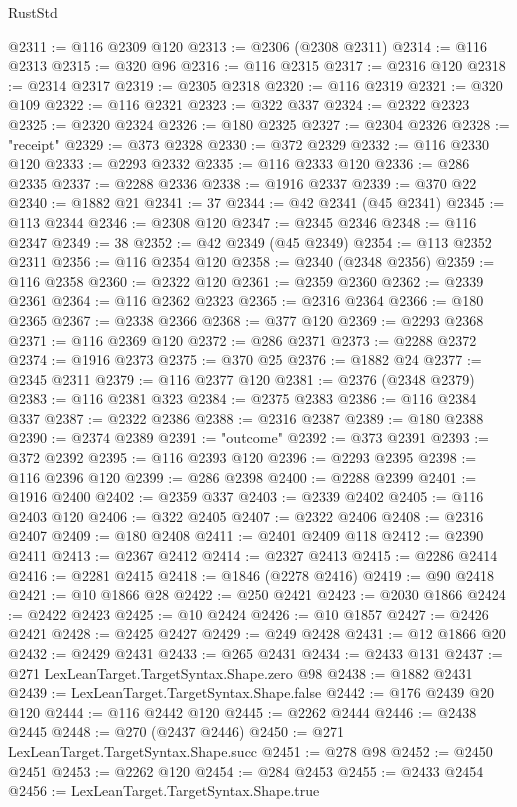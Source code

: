 \begin{lexlean}{RustStd}
\begin{coremodule}
@2311 := @116 @2309 @120
@2313 := @2306 (@2308 @2311)
@2314 := @116 @2313
@2315 := @320 @96
@2316 := @116 @2315
@2317 := @2316 @120
@2318 := @2314 @2317
@2319 := @2305 @2318
@2320 := @116 @2319
@2321 := @320 @109
@2322 := @116 @2321
@2323 := @322 @337
@2324 := @2322 @2323
@2325 := @2320 @2324
@2326 := @180 @2325
@2327 := @2304 @2326
@2328 := "receipt"
@2329 := @373 @2328
@2330 := @372 @2329
@2332 := @116 @2330 @120
@2333 := @2293 @2332
@2335 := @116 @2333 @120
@2336 := @286 @2335
@2337 := @2288 @2336
@2338 := @1916 @2337
@2339 := @370 @22
@2340 := @1882 @21
@2341 := 37
@2344 := @42 @2341 (@45 @2341)
@2345 := @113 @2344
@2346 := @2308 @120
@2347 := @2345 @2346
@2348 := @116 @2347
@2349 := 38
@2352 := @42 @2349 (@45 @2349)
@2354 := @113 @2352 @2311
@2356 := @116 @2354 @120
@2358 := @2340 (@2348 @2356)
@2359 := @116 @2358
@2360 := @2322 @120
@2361 := @2359 @2360
@2362 := @2339 @2361
@2364 := @116 @2362 @2323
@2365 := @2316 @2364
@2366 := @180 @2365
@2367 := @2338 @2366
@2368 := @377 @120
@2369 := @2293 @2368
@2371 := @116 @2369 @120
@2372 := @286 @2371
@2373 := @2288 @2372
@2374 := @1916 @2373
@2375 := @370 @25
@2376 := @1882 @24
@2377 := @2345 @2311
@2379 := @116 @2377 @120
@2381 := @2376 (@2348 @2379)
@2383 := @116 @2381 @323
@2384 := @2375 @2383
@2386 := @116 @2384 @337
@2387 := @2322 @2386
@2388 := @2316 @2387
@2389 := @180 @2388
@2390 := @2374 @2389
@2391 := "outcome"
@2392 := @373 @2391
@2393 := @372 @2392
@2395 := @116 @2393 @120
@2396 := @2293 @2395
@2398 := @116 @2396 @120
@2399 := @286 @2398
@2400 := @2288 @2399
@2401 := @1916 @2400
@2402 := @2359 @337
@2403 := @2339 @2402
@2405 := @116 @2403 @120
@2406 := @322 @2405
@2407 := @2322 @2406
@2408 := @2316 @2407
@2409 := @180 @2408
@2411 := @2401 @2409 @118
@2412 := @2390 @2411
@2413 := @2367 @2412
@2414 := @2327 @2413
@2415 := @2286 @2414
@2416 := @2281 @2415
@2418 := @1846 (@2278 @2416)
@2419 := @90 @2418
@2421 := @10 @1866 @28
@2422 := @250 @2421
@2423 := @2030 @1866
@2424 := @2422 @2423
@2425 := @10 @2424
@2426 := @10 @1857
@2427 := @2426 @2421
@2428 := @2425 @2427
@2429 := @249 @2428
@2431 := @12 @1866 @20
@2432 := @2429 @2431
@2433 := @265 @2431
@2434 := @2433 @131
@2437 := @271 LexLeanTarget.TargetSyntax.Shape.zero @98
@2438 := @1882 @2431
@2439 := LexLeanTarget.TargetSyntax.Shape.false
@2442 := @176 @2439 @20 @120
@2444 := @116 @2442 @120
@2445 := @2262 @2444
@2446 := @2438 @2445
@2448 := @270 (@2437 @2446)
@2450 := @271 LexLeanTarget.TargetSyntax.Shape.succ
@2451 := @278 @98
@2452 := @2450 @2451
@2453 := @2262 @120
@2454 := @284 @2453
@2455 := @2433 @2454
@2456 := LexLeanTarget.TargetSyntax.Shape.true

\end{coremodule}
\end{lexlean}
